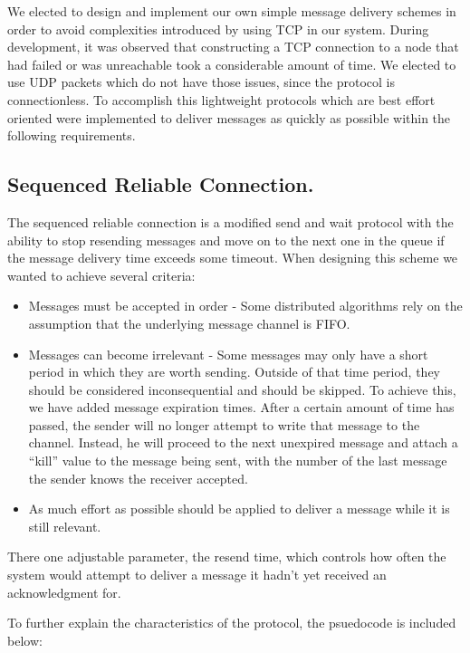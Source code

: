 We elected to design and implement our own simple message delivery schemes in 
order to avoid complexities introduced by using TCP in our system. During 
development, it was observed that constructing a TCP connection to a node that 
had 
failed or was unreachable took a considerable amount of time. We elected to use 
UDP packets which do not have those issues, since the protocol is 
connectionless. To accomplish this lightweight protocols which are best effort 
oriented were implemented to deliver messages as quickly as possible within
the following requirements.

\subsection{Sequenced Reliable Connection.}

The sequenced reliable connection is a modified send and wait protocol with the 
ability to stop resending messages and move on to the next one in the queue if 
the message delivery time exceeds some timeout. When designing this scheme we
wanted to achieve several criteria:

\begin{itemize}
\item Messages must be accepted in order - Some distributed algorithms rely on 
the assumption that the underlying message channel is FIFO.
\item Messages can become irrelevant - Some messages may only have a short 
period in which they are worth sending. Outside of that time period, they 
should be considered inconsequential and should be skipped. To achieve this, we 
have added message expiration times. After a certain amount of time has passed, 
the sender will no longer attempt to write that message to the channel. 
Instead, he will proceed to the next unexpired message and attach a ``kill'' 
value to the message being sent, with the number of the last message the sender 
knows the receiver accepted.
\item As much effort as possible should be applied to deliver a message while 
it is still relevant.
\end{itemize}

There one adjustable parameter, the resend time, which controls how often the 
system would attempt to deliver a message it hadn't yet received an 
acknowledgment for.

To further explain the characteristics of the protocol, the psuedocode is 
included below:


